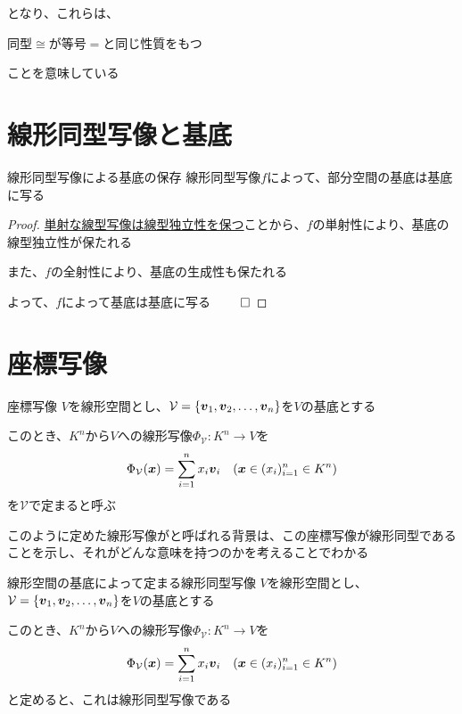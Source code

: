\documentclass[../../../topic_linear-algebra]{subfiles}
\begin{document}
となり、これらは、
\begin{shaded}
  同型$\cong$が等号$=$と同じ性質をもつ
\end{shaded}
ことを意味している

\sectionline
\section{線形同型写像と基底}

\begin{theorem}{線形同型写像による基底の保存}
  線形同型写像$f$によって、部分空間の基底は基底に写る
\end{theorem}

\begin{proof}
  \hyperref[thm:injective-preserves-independence]{単射な線型写像は線型独立性を保つ}ことから、$f$の単射性により、基底の線型独立性が保たれる

  また、$f$の全射性により、基底の生成性も保たれる

  よって、$f$によって基底は基底に写る $\qed$
\end{proof}

\sectionline
\section{座標写像}

\begin{definition}{座標写像}
  $V$を線形空間とし、$\mathcal{V} = \{ \vb*{v}_1, \vb*{v}_2, \dots, \vb*{v}_n \}$を$V$の基底とする

  このとき、$K^n$から$V$への線形写像$\Phi_{\mathcal{V}}\colon K^n \to V$を
  \begin{equation*}
    \Phi_{\mathcal{V}}(\vb*{x}) = \sum_{i=1}^n x_i \vb*{v}_i \quad (\vb*{x} \in (x_i)_{i=1}^n \in K^n)
  \end{equation*}
  を$\mathcal{V}$で定まると呼ぶ
\end{definition}

このように定めた線形写像がと呼ばれる背景は、この座標写像が線形同型であることを示し、それがどんな意味を持つのかを考えることでわかる

\begin{theorem}{線形空間の基底によって定まる線形同型写像}
  $V$を線形空間とし、$\mathcal{V} = \{ \vb*{v}_1, \vb*{v}_2, \dots, \vb*{v}_n \}$を$V$の基底とする

  このとき、$K^n$から$V$への線形写像$\Phi_{\mathcal{V}}\colon K^n \to V$を
  \begin{equation*}
    \Phi_{\mathcal{V}}(\vb*{x}) = \sum_{i=1}^n x_i \vb*{v}_i \quad (\vb*{x} \in (x_i)_{i=1}^n \in K^n)
  \end{equation*}
  と定めると、これは線形同型写像である
\end{theorem}
\end{document}
